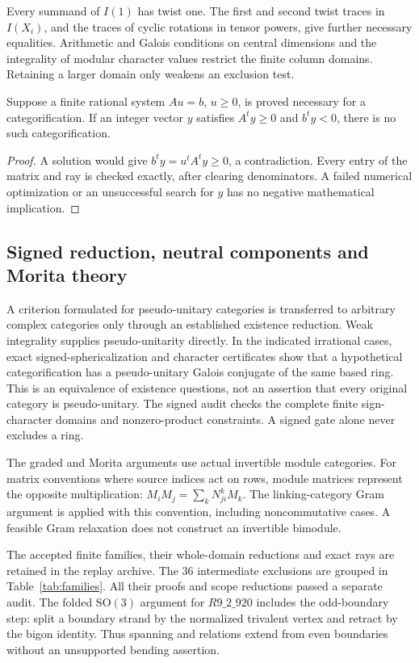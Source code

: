 \documentclass[11pt,a4paper]{article}
\theoremstyle{remark}\newtheorem{remark}[theorem]{Remark}
\begin{document}
Every summand of $I(1)$ has twist one. The first and second twist traces in
$I(X_i)$, and the traces of cyclic rotations in tensor powers, give further
necessary equalities. Arithmetic and Galois conditions on central dimensions
and the integrality of modular character values restrict the finite column
domains. Retaining a larger domain only weakens an exclusion test.

\begin{proposition}
Suppose a finite rational system $Au=b$, $u\geq0$, is proved necessary for a
categorification. If an integer vector $y$ satisfies $A^ty\geq0$ and
$b^ty<0$, there is no such categorification.
\end{proposition}
\begin{proof}
A solution would give $b^ty=u^tA^ty\geq0$, a contradiction. Every entry of
the matrix and ray is checked exactly, after clearing denominators. A
failed numerical optimization or an unsuccessful search for $y$ has no
negative mathematical implication.
\end{proof}

\subsection{Signed reduction, neutral components and Morita theory}
A criterion formulated for pseudo-unitary categories is transferred to
arbitrary complex categories only through an established existence reduction.
Weak integrality supplies pseudo-unitarity directly. In the indicated
irrational cases, exact signed-sphericalization and character certificates
show that a hypothetical categorification has a pseudo-unitary Galois
conjugate of the same based ring. This is an equivalence of existence
questions, not an assertion that every original category is pseudo-unitary.
The signed audit checks the complete finite sign-character domains and
nonzero-product constraints. A signed gate alone never excludes a ring.

The graded and Morita arguments use actual invertible module categories.
For matrix conventions where source indices act on rows, module matrices
represent the opposite multiplication:
$M_iM_j=\sum_kN_{ji}^kM_k$. The linking-category Gram argument is applied
with this convention, including noncommutative cases. A feasible Gram
relaxation does not construct an invertible bimodule.

The accepted finite families, their whole-domain reductions and exact
rays are retained in the replay archive. The 36 intermediate exclusions
are grouped in Table~\ref{tab:families}. All their proofs and scope
reductions passed a separate audit. The folded $\mathrm{SO}(3)$ argument
for $R9\_2\_920$ includes the odd-boundary step: split a boundary strand
by the normalized trivalent vertex and retract by the bigon identity.
Thus spanning and relations extend from even boundaries without an
unsupported bending assertion.

\end{document}
